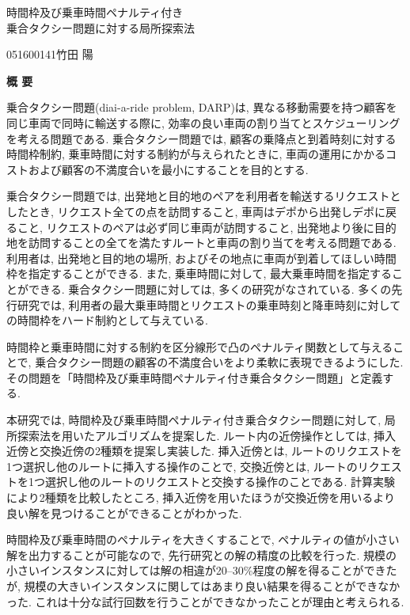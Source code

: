 \begin{center}
{\LARGE 時間枠及び乗車時間ペナルティ付き\\乗合タクシー問題に対する局所探索法}\\[0.5cm]
\end{center}
\hfill
{\large 051600141\qquad 竹田 陽}\\[0.5cm]
\begin{center}
{\Large \bf 概 要}\\
\end{center}


乗合タクシー問題(diai-a-ride problem, DARP)は, 異なる移動需要を持つ顧客を同じ車両で同時に輸送する際に, 効率の良い車両の割り当てとスケジューリングを考える問題である. 乗合タクシー問題では, 顧客の乗降点と到着時刻に対する時間枠制約, 乗車時間に対する制約が与えられたときに, 車両の運用にかかるコストおよび顧客の不満度合いを最小にすることを目的とする.

乗合タクシー問題では, 出発地と目的地のペアを利用者を輸送するリクエストとしたとき, リクエスト全ての点を訪問すること, 車両はデポから出発しデポに戻ること, リクエストのペアは必ず同じ車両が訪問すること, 出発地より後に目的地を訪問することの全てを満たすルートと車両の割り当てを考える問題である. 利用者は, 出発地と目的地の場所, およびその地点に車両が到着してほしい時間枠を指定することができる.
また, 乗車時間に対して, 最大乗車時間を指定することができる.
乗合タクシー問題に対しては, 多くの研究がなされている. 多くの先行研究では, 利用者の最大乗車時間とリクエストの乗車時刻と降車時刻に対しての時間枠をハード制約として与えている.

時間枠と乗車時間に対する制約を区分線形で凸のペナルティ関数として与えることで, 乗合タクシー問題の顧客の不満度合いをより柔軟に表現できるようにした. その問題を「時間枠及び乗車時間ペナルティ付き乗合タクシー問題」と定義する.

本研究では, 時間枠及び乗車時間ペナルティ付き乗合タクシー問題に対して, 局所探索法を用いたアルゴリズムを提案した.
ルート内の近傍操作としては, 挿入近傍と交換近傍の2種類を提案し実装した.
挿入近傍とは, ルートのリクエストを1つ選択し他のルートに挿入する操作のことで, 交換近傍とは, ルートのリクエストを1つ選択し他のルートのリクエストと交換する操作のことである.
計算実験により2種類を比較したところ, 挿入近傍を用いたほうが交換近傍を用いるより良い解を見つけることができることがわかった.

時間枠及び乗車時間のペナルティを大きくすることで, ペナルティの値が小さい解を出力することが可能なので, 先行研究との解の精度の比較を行った. 規模の小さいインスタンスに対しては解の相違が20--30\%程度の解を得ることができたが, 規模の大きいインスタンスに関してはあまり良い結果を得ることができなかった. これは十分な試行回数を行うことができなかったことが理由と考えられる.

